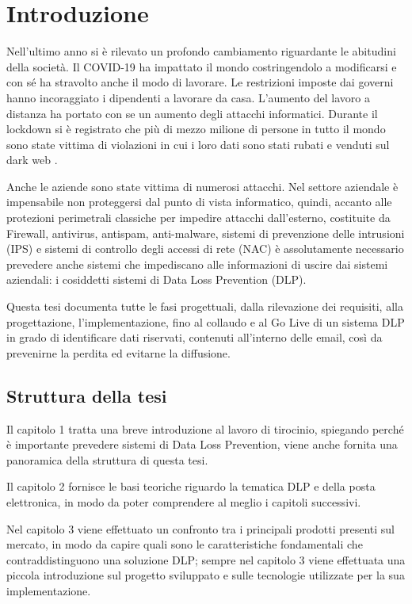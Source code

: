 \chapter{Introduzione}

Nell'ultimo anno si è rilevato un profondo cambiamento riguardante le abitudini della società.
Il COVID-19 ha impattato il mondo costringendolo a modificarsi e con sé ha stravolto anche il modo di lavorare. 
Le restrizioni imposte dai governi hanno incoraggiato i dipendenti a lavorare da casa.
L'aumento del lavoro a distanza ha portato con se un aumento degli attacchi informatici. 
Durante il lockdown si è registrato che più di mezzo milione di persone in tutto il mondo sono state 
vittima di violazioni in cui i loro dati sono stati rubati e venduti sul dark web \cite{Intro}.

Anche le aziende sono state vittima di numerosi attacchi. Nel settore aziendale è impensabile 
non proteggersi dal punto di vista informatico, quindi, accanto alle protezioni perimetrali classiche 
per impedire attacchi dall’esterno, costituite da Firewall, antivirus, antispam, anti-malware, 
sistemi di prevenzione delle intrusioni (IPS) e sistemi di controllo degli accessi di rete (NAC) 
è assolutamente necessario prevedere anche sistemi che impediscano alle informazioni di uscire 
dai sistemi aziendali: i cosiddetti sistemi di Data Loss Prevention (DLP).

Questa tesi documenta tutte le fasi progettuali, dalla rilevazione dei requisiti, alla progettazione, 
l’implementazione, fino al collaudo e al Go Live di un sistema DLP in grado di identificare dati riservati, 
contenuti all'interno delle email, così da prevenirne la perdita ed evitarne la diffusione.

\section{Struttura della tesi}

Il capitolo 1 tratta una breve introduzione al lavoro di tirocinio, 
spiegando perché è importante prevedere sistemi di Data Loss Prevention, 
viene anche fornita una panoramica della struttura di questa tesi.

Il capitolo 2 fornisce le basi teoriche riguardo la tematica DLP e 
della posta elettronica, in modo da poter comprendere al meglio i capitoli successivi.

Nel capitolo 3 viene effettuato un confronto tra i principali prodotti presenti sul mercato, 
in modo da capire quali sono le caratteristiche fondamentali che contraddistinguono una soluzione DLP; 
sempre nel capitolo 3 viene effettuata una piccola introduzione sul progetto sviluppato e sulle tecnologie 
utilizzate per la sua implementazione.


